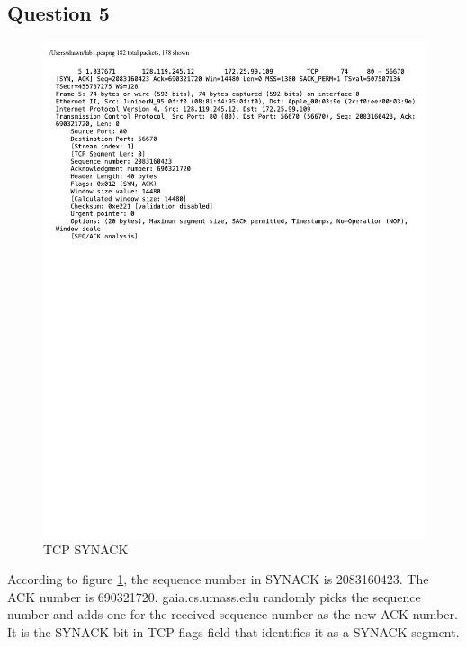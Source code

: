 \documentclass[titlepage, paper=a4, fontsize=11pt]{scrartcl} %
\numberwithin{equation}{section} %
\numberwithin{figure}{section} %
\numberwithin{table}{section} %
\begin{document}
\subsection*{Question 5}
\begin{figure}[!ht]
    \centering
    \includegraphics[width=\textwidth]{images/lab1-q5.pdf}
    \caption{TCP SYNACK}
    \label{fig:tcp-synack}
\end{figure}
According to figure \ref{fig:tcp-synack}, the sequence number in SYNACK is 2083160423. The ACK number is 690321720. gaia.cs.umass.edu randomly picks the sequence number and adds one for the received sequence number as the new ACK number. It is the SYNACK bit in TCP flags field that identifies it as a SYNACK segment. \\
\end{document}
